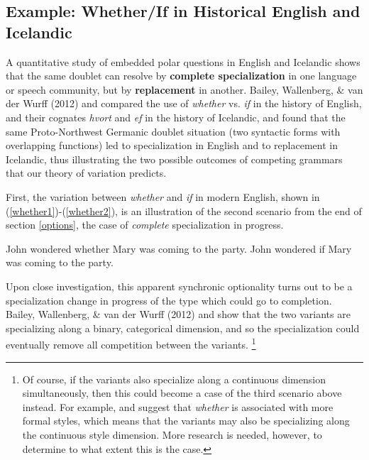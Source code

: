 \subsection{Example: Whether/If in Historical English and Icelandic}
\label{whetherifsect}

A quantitative study of embedded polar questions in English and Icelandic shows that the same doublet can resolve by \textbf{complete specialization} in one language or speech community, but by \textbf{replacement} in another. Bailey, Wallenberg, \& van der Wurff (2012) and  compared the use of \textsl{whether} vs. \textsl{if} in the history of English, and their cognates \textsl{hvort} and \textsl{ef} in the history of Icelandic, and found that the same Proto-Northwest Germanic doublet situation (two syntactic forms with overlapping functions) led to specialization in English and to replacement in Icelandic, thus illustrating the two possible outcomes of competing grammars that our theory of variation predicts.

First, the variation between \textsl{whether} and \textsl{if} in modern English, shown in (\ref{whether1})-(\ref{whether2}), is an illustration of the second scenario from the end of section \ref{options}, the case of \textsl{complete} specialization in progress.

\begin{exe}
		\ex \label{whether1} John wondered whether Mary was coming to the party.
		\ex \label{whether2} John wondered if Mary was coming to the party.
	\end{exe}
	
\noindent Upon close investigation, this apparent synchronic optionality turns out to be a specialization change in progress of the type which could go to completion.
Bailey, Wallenberg, \& van der Wurff (2012) and  show that the two variants are specializing along a binary, categorical dimension, and so the specialization could eventually remove all competition between the variants.
\footnote{Of course, if the variants also specialize along a continuous dimension simultaneously, then this could become a case of the third scenario above instead.
For example, \citet[][690--3]{biberetal1999} and \citet[][973--5]{huddlestonpullum2002} suggest that \textsl{whether} is associated with more formal styles, which means that the variants may also be specializing along the continuous style dimension.
More research is needed, however, to determine to what extent this is the case.}

